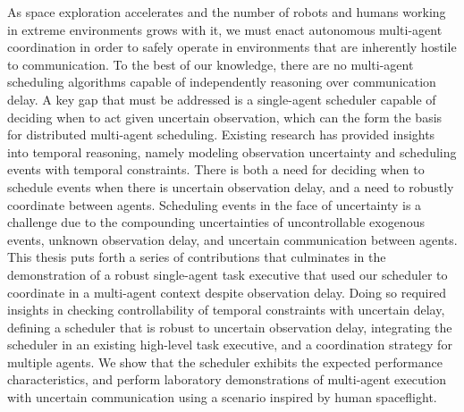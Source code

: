 \documentclass[12pt,vi,leftblank,twoside]{mitthesis}
\begin{document}


\cleardoublepage
\setcounter{savepage}{\thepage}
\begin{abstractpage}

As space exploration accelerates and the number of robots and humans working in extreme environments
grows with it, we must enact autonomous multi-agent coordination in order to safely operate in
environments that are inherently hostile to communication. To the best of our knowledge, there are
no multi-agent scheduling algorithms capable of independently reasoning over communication delay. A
key gap that must be addressed is a single-agent scheduler capable of deciding when to act given
uncertain observation, which can the form the basis for distributed multi-agent scheduling. Existing
research has provided insights into temporal reasoning, namely modeling observation uncertainty and
scheduling events with temporal constraints. There is both a need for deciding when to schedule
events when there is uncertain observation delay, and a need to robustly coordinate between agents.
Scheduling events in the face of uncertainty is a challenge due to the compounding uncertainties of
uncontrollable exogenous events, unknown observation delay, and uncertain communication between
agents. This thesis puts forth a series of contributions that culminates in the demonstration of a
robust single-agent task executive that used our scheduler to coordinate in a multi-agent context
despite observation delay. Doing so required insights in checking controllability of temporal
constraints with uncertain delay, defining a scheduler that is robust to uncertain observation
delay, integrating the scheduler in an existing high-level task executive, and a coordination
strategy for multiple agents. We show that the scheduler exhibits the expected performance
characteristics, and perform laboratory demonstrations of multi-agent execution with uncertain
communication using a scenario inspired by human spaceflight.

\end{abstractpage}
\end{document}
